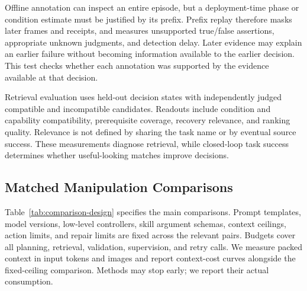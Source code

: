 Offline annotation can inspect an entire episode, but a deployment-time phase or condition estimate must be justified by its prefix. Prefix replay therefore masks later frames and receipts, and measures unsupported true/false assertions, appropriate unknown judgments, and detection delay. Later evidence may explain an earlier failure without becoming information available to the earlier decision. This test checks whether each annotation was supported by the evidence available at that decision.

Retrieval evaluation uses held-out decision states with independently judged compatible and incompatible candidates. Readouts include condition and capability compatibility, prerequisite coverage, recovery relevance, and ranking quality. Relevance is not defined by sharing the task name or by eventual source success. These measurements diagnose retrieval, while closed-loop task success determines whether useful-looking matches improve decisions.

\subsection{Matched Manipulation Comparisons}

Table~\ref{tab:comparison-design} specifies the main comparisons. Prompt templates, model versions, low-level controllers, skill argument schemas, context ceilings, action limits, and repair limits are fixed across the relevant pairs. Budgets cover all planning, retrieval, validation, supervision, and retry calls. We measure packed context in input tokens and images and report context-cost curves alongside the fixed-ceiling comparison. Methods may stop early; we report their actual consumption.

